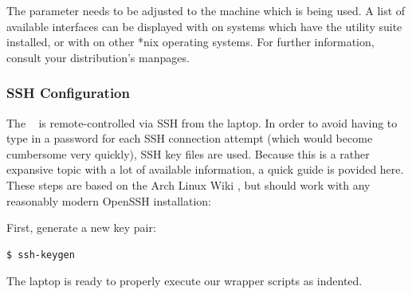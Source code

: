 
The   parameter  needs to  be  adjusted to  the machine  which
is  being  used. A  list  of   available  interfaces  can  be  displayed  with
  on  systems  which have  the    utility  suite
\cite{ref:iproute2}  installed,  or with    \cite{ref:ifconfig}
on  other  *nix  operating  systems. For  further  information,  consult  your
distribution's manpages.


\subsubsection{SSH Configuration}
\label{subsubsec:laptop:sshconf}

The \raspi~  is remote-controlled via SSH  from the laptop. In order  to avoid
having to  type in  a password  for each SSH  connection attempt  (which would
become cumbersome  very quickly), SSH  key files  are used. Because this  is a
rather expansive topic  with a lot of available information,  a quick guide is
povided  here\footnotemark. These  steps are  based  on  the Arch  Linux  Wiki
\cite{ref:archWiki:SSH} , but  should work with any  reasonably modern OpenSSH
installation:



First, generate a new key pair:

\begin{verbatim}
$ ssh-keygen
\end{verbatim}

The laptop is ready to properly execute our wrapper scripts as indented.
